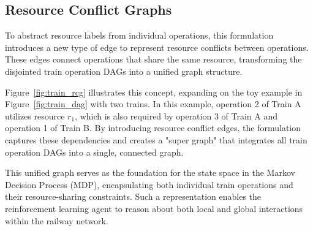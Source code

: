 \documentclass[runningheads]{llncs}
\begin{document}
\subsection{Resource Conflict Graphs}
\label{sss:resource_conflicts}
To abstract resource labels from individual operations, this formulation introduces a new type of edge to represent resource conflicts between operations. 
These edges connect operations that share the same resource, transforming the disjointed train operation DAGs into a unified graph structure. 

Figure~\ref{fig:train_rcg} illustrates this concept, expanding on the toy example in Figure~\ref{fig:train_dag} with two trains. 
In this example, operation 2 of Train A utilizes resource $r_1$, which is also required by operation 3 of Train A and operation 1 of Train B. 
By introducing resource conflict edges, the formulation captures these dependencies and creates a "super graph" that integrates all train operation DAGs into a single, connected graph.

This unified graph serves as the foundation for the state space in the Markov Decision Process (MDP), encapsulating both individual train operations and their resource-sharing constraints. 
Such a representation enables the reinforcement learning agent to reason about both local and global interactions within the railway network.
\end{document}
